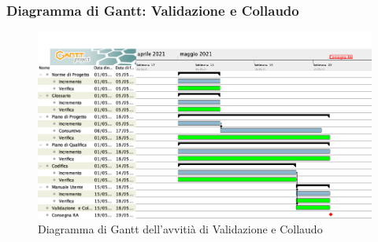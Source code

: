 \newpage
\subsubsection{Diagramma di Gantt: Validazione e Collaudo}
\begin{figure}[ht]
    \centering
    \includegraphics[width=\textwidth]{../../Immagini/GanttValidazioneECollaudo}
    \caption{Diagramma di Gantt dell'avvitià di Validazione e Collaudo}
\end{figure}